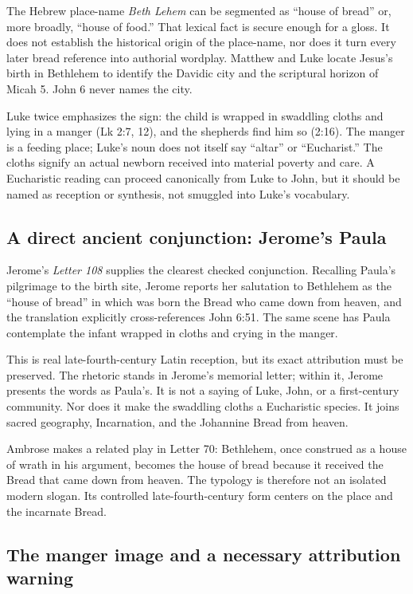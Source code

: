\begin{deepstudy}
The Hebrew place-name \emph{Beth Lehem} can be segmented as ``house of
bread'' or, more broadly, ``house of food.'' That lexical fact is secure enough
for a gloss. It does not establish the historical origin of the place-name, nor
does it turn every later bread reference into authorial wordplay. Matthew and
Luke locate Jesus's birth in Bethlehem to identify the Davidic city and the
scriptural horizon of Micah 5. John 6 never names the city.

Luke twice emphasizes the sign: the child is wrapped in swaddling cloths and
lying in a manger (Lk 2:7, 12), and the shepherds find him so (2:16). The
manger is a feeding place; Luke's noun does not itself say ``altar'' or
``Eucharist.'' The cloths signify an actual newborn received into material
poverty and care. A Eucharistic reading can proceed canonically from Luke to
John, but it should be named as reception or synthesis, not smuggled into
Luke's vocabulary.

\subsection{A direct ancient conjunction: Jerome's Paula}

Jerome's \emph{Letter 108} supplies the clearest checked conjunction. Recalling
Paula's pilgrimage to the birth site, Jerome reports her salutation to
Bethlehem as the ``house of bread'' in which was born the Bread who came down
from heaven, and the translation explicitly cross-references John 6:51. The
same scene has Paula contemplate the infant wrapped in cloths and crying in the
manger.

This is real late-fourth-century Latin reception, but its exact attribution
must be preserved. The rhetoric stands in Jerome's memorial letter; within it,
Jerome presents the words as Paula's. It is not a saying of Luke, John, or a
first-century community. Nor does it make the swaddling cloths a Eucharistic
species. It joins sacred geography, Incarnation, and the Johannine Bread from
heaven.

Ambrose makes a related play in Letter 70: Bethlehem, once construed as a
house of wrath in his argument, becomes the house of bread because it received
the Bread that came down from heaven. The typology is therefore not an isolated
modern slogan. Its controlled late-fourth-century form centers on the place
and the incarnate Bread.

\subsection{The manger image and a necessary attribution warning}


\end{deepstudy}
